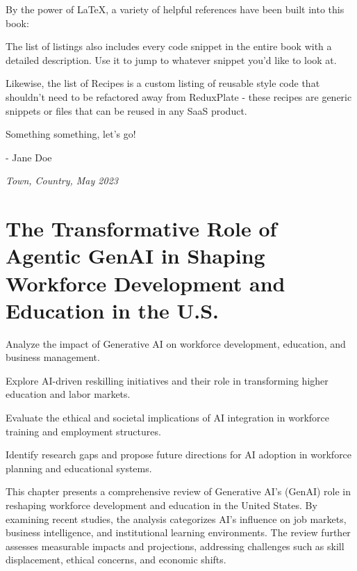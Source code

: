 \documentclass[a4paper,headinclude=on,footinclude=on,12pt,oneside]{scrbook}
\begin{document}

By the power of LaTeX, a variety of helpful references have been built into this book:



The list of listings also includes every code snippet in the entire book with a detailed description. Use it to jump to whatever snippet you'd like to look at.

Likewise, the list of Recipes is a custom listing of reusable style code that shouldn't need to be refactored away from ReduxPlate - these recipes are generic snippets or files that can be reused in any SaaS product.


Something something, let's go!

- Jane Doe

\textit{Town, Country, May 2023}



\chapter{The Transformative Role of Agentic GenAI in Shaping Workforce Development and Education in the U.S.}

\begin{arrows}
	\item Analyze the impact of Generative AI on workforce development, education, and business management.
	\item Explore AI-driven reskilling initiatives and their role in transforming higher education and labor markets.
	\item Evaluate the ethical and societal implications of AI integration in workforce training and employment structures.
	\item Identify research gaps and propose future directions for AI adoption in workforce planning and educational systems.
\end{arrows}

This chapter presents a comprehensive review of Generative AI's (GenAI) role in reshaping workforce development and education in the United States. By examining recent studies, the analysis categorizes AI's influence on job markets, business intelligence, and institutional learning environments. The review further assesses measurable impacts and projections, addressing challenges such as skill displacement, ethical concerns, and economic shifts.
\end{document}
